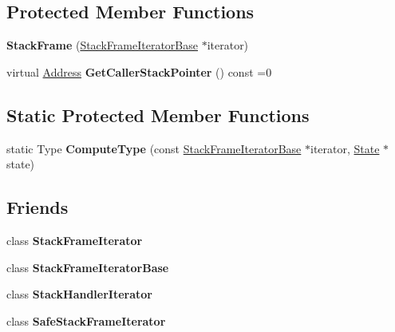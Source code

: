\subsection*{Protected Member Functions}
\begin{DoxyCompactItemize}
\item 
\mbox{\label{classv8_1_1internal_1_1StackFrame_abcccdfb9008438a94d62d4eb8bc4c9b2}} 
{\bfseries Stack\+Frame} (\mbox{\hyperlink{classv8_1_1internal_1_1StackFrameIteratorBase}{Stack\+Frame\+Iterator\+Base}} $\ast$iterator)
\item 
\mbox{\label{classv8_1_1internal_1_1StackFrame_a92124e9b6e55643af188b7396334be71}} 
virtual \mbox{\hyperlink{classuintptr__t}{Address}} {\bfseries Get\+Caller\+Stack\+Pointer} () const =0
\end{DoxyCompactItemize}
\subsection*{Static Protected Member Functions}
\begin{DoxyCompactItemize}
\item 
\mbox{\label{classv8_1_1internal_1_1StackFrame_a6bc055bcd72f37e6697c46c6d2b1a1b2}} 
static Type {\bfseries Compute\+Type} (const \mbox{\hyperlink{classv8_1_1internal_1_1StackFrameIteratorBase}{Stack\+Frame\+Iterator\+Base}} $\ast$iterator, \mbox{\hyperlink{structv8_1_1internal_1_1StackFrame_1_1State}{State}} $\ast$state)
\end{DoxyCompactItemize}
\subsection*{Friends}
\begin{DoxyCompactItemize}
\item 
\mbox{\label{classv8_1_1internal_1_1StackFrame_a71cc3464740f5b07cfcdda465b494567}} 
class {\bfseries Stack\+Frame\+Iterator}
\item 
\mbox{\label{classv8_1_1internal_1_1StackFrame_ac7310421866976ca454bbe11c5f926c3}} 
class {\bfseries Stack\+Frame\+Iterator\+Base}
\item 
\mbox{\label{classv8_1_1internal_1_1StackFrame_a3781b5e70cd04856f8ecda880742e298}} 
class {\bfseries Stack\+Handler\+Iterator}
\item 
\mbox{\label{classv8_1_1internal_1_1StackFrame_aa1c3e6274807549ee11be5be6cd1ae62}} 
class {\bfseries Safe\+Stack\+Frame\+Iterator}
\end{DoxyCompactItemize}


